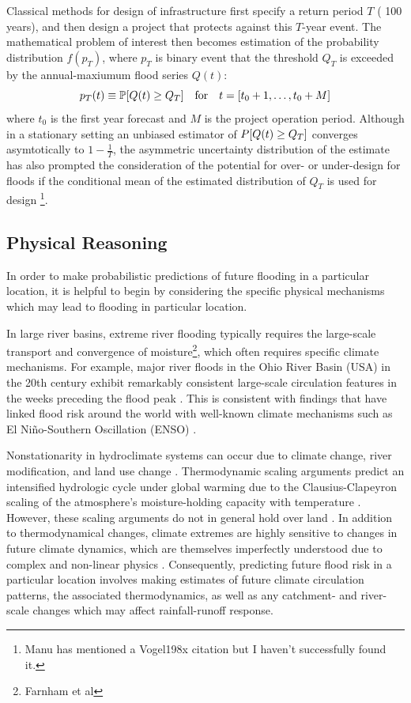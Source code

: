 \documentclass[12pt]{article}
\begin{document}
Classical methods for design of infrastructure first specify a return period \(T\) (\ie{} 100 years), and then design a project that protects against this \(T\)-year event.
The mathematical problem of interest then becomes estimation of the probability distribution \( f(p_T) \), where \( p_T \) is binary event that the threshold \( Q_T \) is exceeded by the annual-maxiumum flood series \( Q(t) \):
\begin{equation*}
  p_T(t) \equiv \probability \qty[ Q(t) \geq Q_T] \qqtext{for} t = \qty[t_0 + 1, \ldots, t_0 + M]
\end{equation*}
where \( t_0 \) is the first year forecast and \( M \) is the project operation period.
Although in a stationary setting an unbiased estimator of \( P \qty[ Q(t) \geq Q_T] \) converges asymtotically to \(1 - \frac{1}{T}\), the asymmetric uncertainty distribution of the estimate has also prompted the consideration of the potential for over- or under-design for floods if the conditional mean of the estimated distribution of \( Q_T \) is used for design \citep{Stedinger1997}\footnote{Manu has mentioned a Vogel198x citation but I haven't successfully found it.}.

\subsection{Physical Reasoning}

In order to make probabilistic predictions of future flooding in a particular location, it is helpful to begin by considering the specific physical mechanisms which may lead to flooding in particular location.

In large river basins, extreme river flooding typically requires the large-scale transport and convergence of moisture\citep{Lu2013,Merz2014,Dacre2014}\footnote{Farnham et al}, which often requires specific climate mechanisms.
For example, major river floods in the Ohio River Basin (USA) in the 20th century exhibit remarkably consistent large-scale circulation features in the weeks preceding the flood peak \citep{Nakamura2012,Robertson2015}.
This is consistent with findings that have linked flood risk around the world with well-known climate mechanisms such as El Ni\~{n}o-Southern Oscillation (ENSO) \citep{Ward2014,Emerton2017}.

Nonstationarity in hydroclimate systems can occur due to climate change, river modification, and land use change \citep{Milly2008,Merz2014}.
Thermodynamic scaling arguments predict an intensified hydrologic cycle under global warming due to the Clausius-Clapeyron scaling of the atmosphere's moisture-holding capacity with temperature \citep[see][]{Muller2011,OGorman2015}.
However, these scaling arguments do not in general hold over land \citep{Byrne2015,Shaw2016}.
In addition to thermodynamical changes, climate extremes are highly sensitive to changes in future climate dynamics, which are themselves imperfectly understood due to complex and non-linear physics \citep{Palmer2013}.
Consequently, predicting future flood risk in a particular location involves making estimates of future climate circulation patterns, the associated thermodynamics, as well as any catchment- and river-scale changes which may affect rainfall-runoff response.
\end{document}
